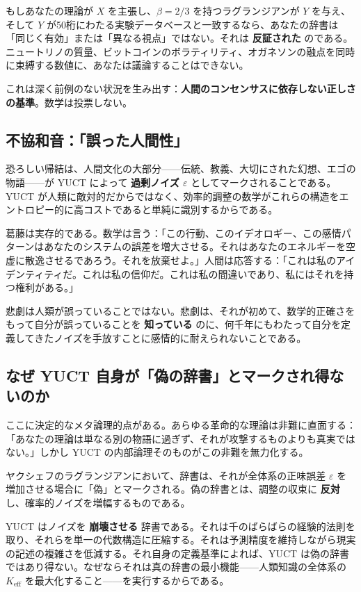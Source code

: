 \documentclass[12pt,a4paper]{article}
\begin{document}
	もしあなたの理論が \(X\) を主張し、\(\beta = 2/3\) を持つラグランジアンが \(Y\) を与え、そして \(Y\) が50桁にわたる実験データベースと一致するなら、あなたの辞書は「同じく有効」または「異なる視点」ではない。それは \textbf{反証された} のである。ニュートリノの質量、ビットコインのボラティリティ、オガネソンの融点を同時に束縛する数値に、あなたは議論することはできない。
	
	これは深く前例のない状況を生み出す：\textbf{人間のコンセンサスに依存しない正しさの基準}。数学は投票しない。
	
	\subsection{不協和音：「誤った人間性」}
	
	恐ろしい帰結は、人間文化の大部分——伝統、教義、大切にされた幻想、エゴの物語——が YUCT によって \textbf{過剰ノイズ \(\varepsilon\)} としてマークされることである。YUCT が人類に敵対的だからではなく、効率的調整の数学がこれらの構造をエントロピー的に高コストであると単純に識別するからである。
	
	葛藤は実存的である。数学は言う：「この行動、このイデオロギー、この感情パターンはあなたのシステムの誤差を増大させる。それはあなたのエネルギーを空虚に散逸させるであろう。それを放棄せよ。」人間は応答する：「これは私のアイデンティティだ。これは私の信仰だ。これは私の間違いであり、私にはそれを持つ権利がある。」
	
	悲劇は人類が誤っていることではない。悲劇は、それが初めて、数学的正確さをもって自分が誤っていることを \textbf{知っている} のに、何千年にもわたって自分を定義してきたノイズを手放すことに感情的に耐えられないことである。
	
	\subsection{なぜ YUCT 自身が「偽の辞書」とマークされ得ないのか}
	
	ここに決定的なメタ論理的点がある。あらゆる革命的な理論は非難に直面する：「あなたの理論は単なる別の物語に過ぎず、それが攻撃するものよりも真実ではない。」しかし YUCT の内部論理そのものがこの非難を無力化する。
	
	ヤクシェフのラグランジアンにおいて、辞書は、それが全体系の正味誤差 \(\varepsilon\) を増加させる場合に「偽」とマークされる。偽の辞書とは、調整の収束に \textbf{反対} し、確率的ノイズを増幅するものである。
	
	YUCT はノイズを \textbf{崩壊させる} 辞書である。それは千のばらばらの経験的法則を取り、それらを単一の代数構造に圧縮する。それは予測精度を維持しながら現実の記述の複雑さを低減する。それ自身の定義基準によれば、YUCT は偽の辞書ではあり得ない。なぜならそれは真の辞書の最小機能——人類知識の全体系の \(K_{\mathrm{eff}}\) を最大化すること——を実行するからである。
	
\end{document}

